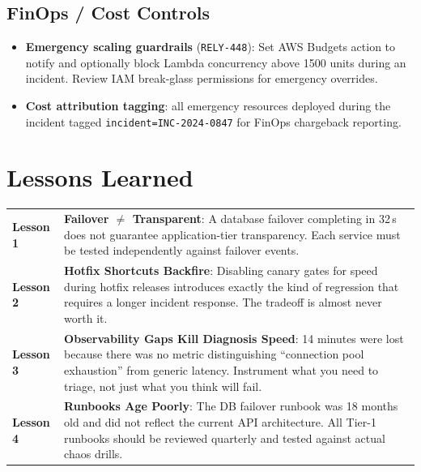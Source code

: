 \documentclass[11pt,a4paper]{article}
\begin{document}
\subsection{FinOps / Cost Controls}

\begin{itemize}[leftmargin=*, itemsep=3pt]
  \item[\textcolor{statusopen}{\faIcon{circle}}]
    \textbf{Emergency scaling guardrails} (\texttt{RELY-448}): Set AWS Budgets action
    to notify and optionally block Lambda concurrency above 1500 units during
    an incident. Review IAM break-glass permissions for emergency overrides.

  \item[\textcolor{statusdone}{\faIcon{check-circle}}]
    \textbf{Cost attribution tagging}: all emergency resources deployed during the
    incident tagged \texttt{incident=INC-2024-0847} for FinOps chargeback reporting.
\end{itemize}

\section{Lessons Learned}

\begin{infobox}
\setlength{\parskip}{0pt}
\begin{tabularx}{\linewidth}{@{}>{\bfseries\small\color{accent}}l@{\hspace{6mm}}>{\small\raggedright\arraybackslash}X@{}}
Lesson 1 & \textbf{Failover $\neq$ Transparent}: A database failover completing in 32\,s
            does not guarantee application-tier transparency. Each service must be tested
            independently against failover events.\\[4pt]
Lesson 2 & \textbf{Hotfix Shortcuts Backfire}: Disabling canary gates for speed during
            hotfix releases introduces exactly the kind of regression that requires a longer
            incident response. The tradeoff is almost never worth it.\\[4pt]
Lesson 3 & \textbf{Observability Gaps Kill Diagnosis Speed}: 14 minutes were lost because
            there was no metric distinguishing ``connection pool exhaustion'' from generic
            latency. Instrument what you need to triage, not just what you think will
            fail.\\[4pt]
Lesson 4 & \textbf{Runbooks Age Poorly}: The DB failover runbook was 18 months old and
            did not reflect the current API architecture. All Tier-1 runbooks should be
            reviewed quarterly and tested against actual chaos drills.\\
\end{tabularx}
\setlength{\parskip}{4pt plus 1pt}
\end{infobox}
\end{document}
